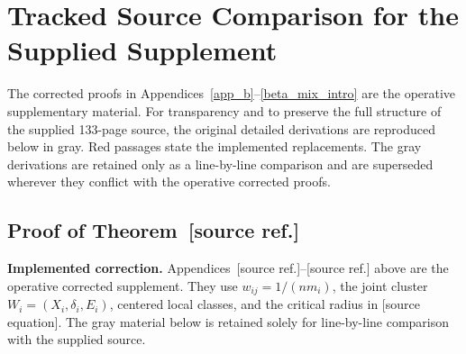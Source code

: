 \documentclass[twoside,11pt]{article}
\makeatletter
\newenvironment{revision}{\color{revisionred}}{}
\newcommand{\implementedchange}[1]{%
  \par\smallskip\noindent
  {\color{revisionred}\textbf{Implemented correction.} #1}%
  \par\smallskip}
\newcommand{\discardlabel}[1]{}
\newcommand{\discardtwo}[2]{}
\newcommand{\legacyref}[1]{\textup{[source ref.]}}
\newcommand{\legacyeqref}[1]{\textup{[source equation]}}
\newenvironment{legacycomparison}{%
  \begingroup\color{legacygray}%
  \let\label\discardlabel
  \let\originallabel\discardlabel
  \let\ref\legacyref
  \let\pageref\legacyref
  \let\eqref\legacyeqref
  \let\cref\legacyref
  \let\Cref\legacyref
  \let\autoref\legacyref
  \let\aliasref\discardtwo
}{\endgroup}
\newcommand{\aliasref}[2]{%
  \@ifundefined{r@#2}{}{%
    \expandafter\let\csname r@#1\expandafter\endcsname\csname r@#2\endcsname}}
\makeatother
\begin{document}
\section{Tracked Source Comparison for the Supplied Supplement}
\label{app:tracked-source-comparison}
\begin{revision}
The corrected proofs in Appendices~\ref{app_b}--\ref{beta_mix_intro} are the operative supplementary material. For transparency and to preserve the full structure of the supplied 133-page source, the original detailed derivations are reproduced below in gray. Red passages state the implemented replacements. The gray derivations are retained only as a line-by-line comparison and are superseded wherever they conflict with the operative corrected proofs.
\end{revision}
\begin{legacycomparison}
% 
\subsection{Proof of Theorem~\ref{Theorem_1}}
\implementedchange{Appendices~\ref{app_b}--\ref{beta_mix_intro} above are the operative corrected supplement. They use $w_{ij}=1/(nm_i)$, the joint cluster $W_i=(X_i,\delta_i,E_i)$, centered local classes, and the critical radius in \eqref{eq:critical_radius}. The gray material below is retained solely for line-by-line comparison with the supplied source.}
\label{app_b}



\end{legacycomparison}
\end{document}
